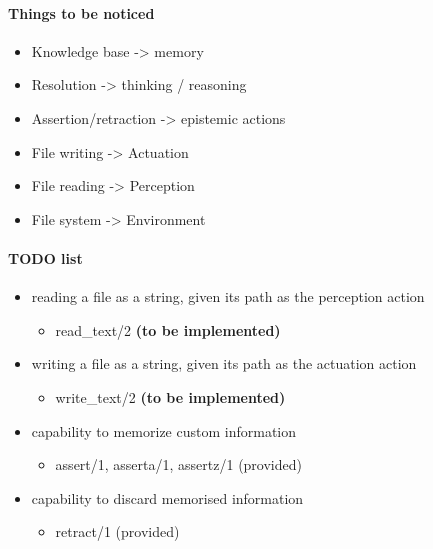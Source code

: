 \hypertarget{things-to-be-noticed}{%
\paragraph{Things to be noticed}\label{things-to-be-noticed}}

\begin{itemize}
\item
  Knowledge base -\textgreater{} memory
\item
  Resolution -\textgreater{} thinking / reasoning
\item
  Assertion/retraction -\textgreater{} epistemic actions
\item
  File writing -\textgreater{} Actuation
\item
  File reading -\textgreater{} Perception
\item
  File system -\textgreater{} Environment
\end{itemize}

\hypertarget{todo-list}{%
\paragraph{TODO list}\label{todo-list}}

\begin{itemize}
\tightlist
\item
  reading a file as a string, given its path as the perception action

  \begin{itemize}
  \tightlist
  \item
    read\_text/2 \textbf{(to be implemented)}
  \end{itemize}
\item
  writing a file as a string, given its path as the actuation action

  \begin{itemize}
  \tightlist
  \item
    write\_text/2 \textbf{(to be implemented)}
  \end{itemize}
\item
  capability to memorize custom information

  \begin{itemize}
  \tightlist
  \item
    assert/1, asserta/1, assertz/1 (provided)
  \end{itemize}
\item
  capability to discard memorised information

  \begin{itemize}
  \tightlist
  \item
    retract/1 (provided)
  \end{itemize}
\end{itemize}

